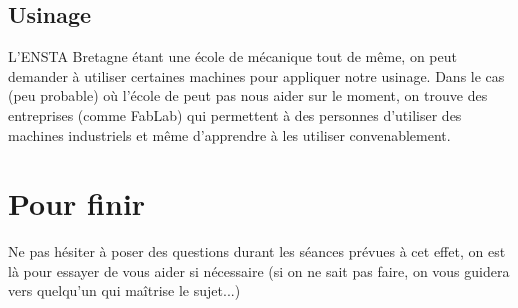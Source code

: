 \documentclass[fleqn,10pt]{SelfArx} %
\begin{document}
\subsection{Usinage}

L'ENSTA Bretagne étant une école de mécanique tout de même, on peut demander à utiliser certaines machines pour appliquer notre usinage. Dans le cas (peu probable) où l'école de peut pas nous aider sur le moment, on trouve des entreprises (comme FabLab) qui permettent à des personnes d'utiliser des machines industriels et même d'apprendre à les utiliser convenablement.


\section*{Pour finir} %


Ne pas hésiter à poser des questions durant les séances prévues à cet effet, on est là pour essayer de vous aider si nécessaire (si on ne sait pas faire, on vous guidera vers quelqu'un qui maîtrise le sujet...)


\end{document}
